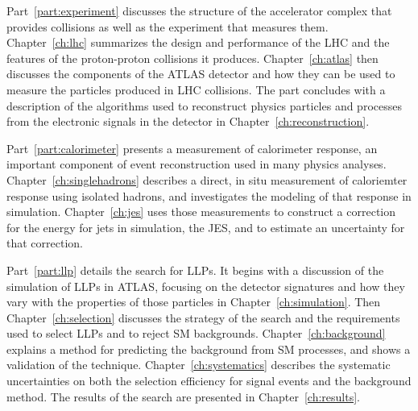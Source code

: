 Part~\ref{part:experiment} discusses the structure of the accelerator complex that provides collisions as well as the experiment that measures them.
Chapter~\ref{ch:lhc} summarizes the design and performance of the \ac{LHC} and the features of the proton-proton collisions it produces.
Chapter~\ref{ch:atlas} then discusses the components of the ATLAS detector and how they can be used to measure the particles produced in \ac{LHC} collisions.
The part concludes with a description of the algorithms used to reconstruct physics particles and processes from the electronic signals in the detector in Chapter~\ref{ch:reconstruction}.

Part~\ref{part:calorimeter} presents a measurement of calorimeter response, an important component of event reconstruction used in many physics analyses.
Chapter~\ref{ch:singlehadrons} describes a direct, in situ measurement of caloriemter response using isolated hadrons, and investigates the modeling of that response in simulation.
Chapter~\ref{ch:jes} uses those measurements to construct a correction for the energy for jets in simulation, the \ac{JES}, and to estimate an uncertainty for that correction.

Part~\ref{part:llp} details the search for \acp{LLP}.
It begins with a discussion of the simulation of \acp{LLP} in ATLAS, focusing on the detector signatures and how they vary with the properties of those particles in Chapter~\ref{ch:simulation}.
Then Chapter~\ref{ch:selection} discusses the strategy of the search and the requirements used to select \acp{LLP} and to reject \ac{SM} backgrounds.
Chapter~\ref{ch:background} explains a method for predicting the background from \ac{SM} processes, and shows a validation of the technique.
Chapter~\ref{ch:systematics} describes the systematic uncertainties on both the selection efficiency for signal events and the background method.
The results of the search are presented in Chapter~\ref{ch:results}. 


